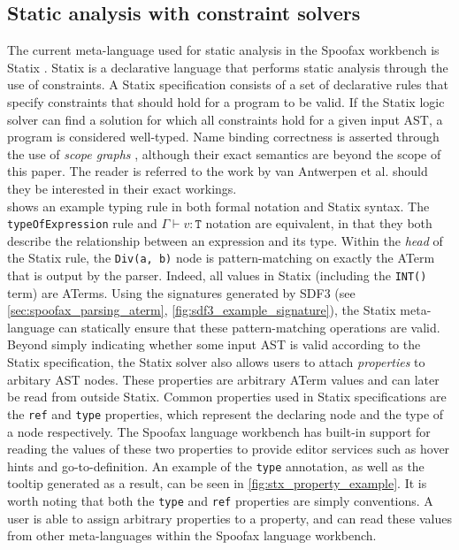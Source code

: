 \subsection{Static analysis with constraint solvers}
\label{sec:spoofax_constraint}
The current meta-language used for static analysis in the Spoofax workbench is Statix \cite{AntwerpenPRV18}. Statix is a declarative language that performs static analysis through the use of constraints. A Statix specification consists of a set of declarative rules that specify constraints that should hold for a program to be valid. If the Statix logic solver can find a solution for which all constraints hold for a given input \ac{AST}, a program is considered well-typed. Name binding correctness is asserted through the use of \textit{scope graphs} \cite{TUD-SERG-2015-009}, although their exact semantics are beyond the scope of this paper. The reader is referred to the work by van Antwerpen et al. \cite{TUD-SERG-2015-009,AntwerpenPRV18,VanAntwerpen2016} should they be interested in their exact workings. \\

 shows an example typing rule in both formal notation and Statix syntax. The \texttt{typeOfExpression} rule and $\Gamma \vdash v : \texttt{T}$ notation are equivalent, in that they both describe the relationship between an expression and its type. Within the \textit{head} of the Statix rule, the \texttt{Div(a, b)} node is pattern-matching on exactly the \ac{ATerm} that is output by the parser. Indeed, all values in Statix (including the \texttt{INT()} term) are \acp{ATerm}. Using the signatures generated by SDF3 (see \cref{sec:spoofax_parsing_aterm}, \cref{fig:sdf3_example_signature}), the Statix meta-language can statically ensure that these pattern-matching operations are valid.\\

Beyond simply indicating whether some input \ac{AST} is valid according to the Statix specification, the Statix solver also allows users to attach \textit{properties} to arbitary AST nodes. These properties are arbitrary \ac{ATerm} values and can later be read from outside Statix. Common properties used in Statix specifications are the \texttt{ref} and \texttt{type} properties, which represent the declaring node and the type of a node respectively. The Spoofax language workbench has built-in support for reading the values of these two properties to provide editor services such as hover hints and go-to-definition. An example of the \texttt{type} annotation, as well as the tooltip generated as a result, can be seen in \cref{fig:stx_property_example}. It is worth noting that both the \texttt{type} and \texttt{ref} properties are simply conventions. A user is able to assign arbitrary properties to a property, and can read these values from other meta-languages within the Spoofax language workbench.

